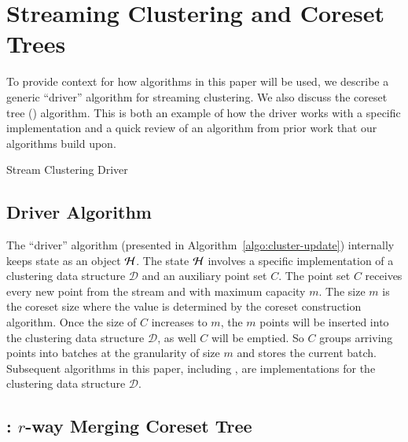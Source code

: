 \section{Streaming Clustering and Coreset Trees}
\label{sec:background}
To provide context for how algorithms in this paper will be used, we describe a
generic ``driver'' algorithm for streaming clustering.  We also discuss the
coreset tree (\ct) algorithm.  This is both an example of how the driver works
with a specific implementation and a quick review of an algorithm from prior
work that our algorithms build upon.

\begin{algorithm}[tb]
\caption{Stream Clustering Driver}\label{algo:cluster-init}
\label{algo:cluster-update}
\label{algo:cluster-query}
\end{algorithm}

\subsection{Driver Algorithm}
The ``driver'' algorithm (presented in Algorithm~\ref{algo:cluster-update}) internally keeps state as an object $\mathcal{H}$. The state $\mathcal{H}$ involves a specific implementation of a clustering data structure $\mathcal{D}$ and an auxiliary point set $C$. The point set $C$ receives every new point from the stream and with maximum capacity $m$. The size $m$ is the coreset size where the value is determined by the coreset construction algorithm. Once the size of $C$ increases to $m$, the $m$ points will be inserted into the clustering data structure $\mathcal{D}$, as well $C$ will be emptied.  So $C$ groups arriving points into batches at the granularity of size $m$ and stores the current batch.  Subsequent algorithms in this paper, including \ct, are implementations for the clustering data structure $\mathcal{D}$.

\subsection{\ct: $r$-way Merging Coreset Tree}
\label{sec:cstree}

